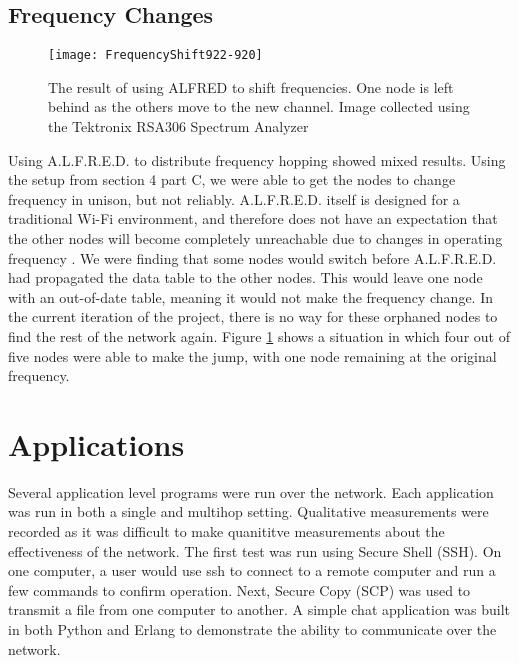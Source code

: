\subsection{Frequency Changes}

\begin{figure}
	\centering
	\texttt{[image: FrequencyShift922-920]}
	\caption{The result of using ALFRED to shift frequencies. One node is left behind as the others move to the new channel. Image collected using the Tektronix RSA306 Spectrum Analyzer}
	\label{fig:freqshift}
\end{figure}


Using A.L.F.R.E.D. to distribute frequency hopping showed mixed results. Using the setup from section 4 part C, we were able to get the nodes to change frequency in unison, but not reliably. A.L.F.R.E.D. itself is designed for a traditional Wi-Fi environment, and therefore does not have an expectation that the other nodes will become completely unreachable due to changes in operating frequency \cite{0015}. We were finding that some nodes would switch before A.L.F.R.E.D. had propagated the data table to the other nodes. This would leave one node with an out-of-date table, meaning it would not make the frequency change. In the current iteration of the project, there is no way for these orphaned nodes to find the rest of the network again. Figure \ref{fig:freqshift} shows a situation in which four out of five nodes were able to make the jump, with one node remaining at the original frequency.

\section{Applications}


Several application level programs were run over the network. Each application was run in both a single and multihop setting. Qualitative measurements were recorded as it was difficult to make quanititve measurements about the effectiveness of the network. The first test was run using Secure Shell (SSH). On one computer, a user would use ssh to connect to a remote computer and run a few commands to confirm operation. Next, Secure Copy (SCP) was used to transmit a file from one computer to another. A simple chat application was built in both Python and Erlang to demonstrate the ability to communicate over the network. 


